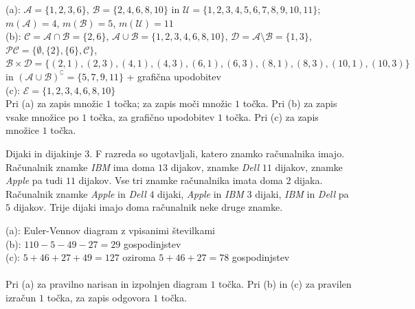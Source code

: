 \documentclass[addpoints]{exam}
\begin{document}
\begin{questions}
    \begin{solution}[12cm]
        (a): $\mathcal{A}=\{1,2,3,6\}$, $\mathcal{B}=\{2,4,6,8,10\}$ in $\mathcal{U}=\{1,2,3,4,5,6,7,8,9,10,11\}$; $m(\mathcal{A})=4$, $m(\mathcal{B})=5$, $m(\mathcal{U})=11$  \\
        (b): $\mathcal{C}=\mathcal{A}\cap\mathcal{B}=\{2,6\}$, $\mathcal{A}\cup\mathcal{B}=\{1,2,3,4,6,8,10\}$, $\mathcal{D}=\mathcal{A}\setminus\mathcal{B}=\{1,3\}$, $\mathcal{PC}=\{\emptyset,\{2\},\{6\},\mathcal{C}\}$, $\mathcal{B}\times\mathcal{D}=\{(2,1),(2,3),(4,1),(4,3),(6,1),(6,3),(8,1),(8,3),(10,1),(10,3)\}$ in $(\mathcal{A}\cup\mathcal{B})^\complement=\{5,7,9,11\}$ + grafična upodobitev\\
        (c): $\mathcal{E}=\{1,2,3,4,6,8,10\}$ \\
        Pri (a) za zapis množic $1$ točka; za zapis moči množic $1$ točka. Pri (b) za zapis vsake množice po $1$ točka, za grafično upodobitev $1$ točka. Pri (c) za zapis množice $1$ točka.
    \end{solution}






      \newpage
    \question
    Dijaki in dijakinje 3. F razreda so ugotavljali, katero znamko računalnika imajo.
    Računalnik znamke \textit{IBM} ima doma $13$ dijakov, znamke \textit{Dell} $11$ dijakov, znamke \textit{Apple} pa tudi $11$ dijakov.
    Vse tri znamke računalnika imata doma $2$ dijaka. Računalnik znamke \textit{Apple} in \textit{Dell} $4$ dijaki, \textit{Apple} in \textit{IBM} $3$ dijaki, \textit{IBM} in \textit{Dell} pa $5$ dijakov.
    Trije dijaki imajo doma računalnik neke druge znamke.

    \begin{solution}[10cm]
        (a): Euler-Vennov diagram z vpisanimi številkami \\
        (b): $110-5-49-27=29$ gospodinjstev\\
        (c): $5+46+27+49=127$ oziroma $5+46+27=78$ gospodinjstev \\ \\
        Pri (a) za pravilno narisan in izpolnjen diagram $1$ točka. Pri (b) in (c) za pravilen izračun $1$ točka, za zapis odgovora $1$ točka.
    \end{solution}





\end{questions}
\end{document}
